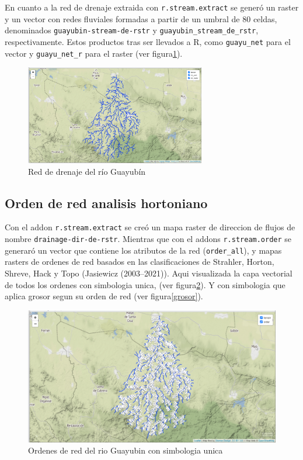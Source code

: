 \documentclass[11pt,]{article}
\begin{document}
En cuanto a la red de drenaje extraida con \texttt{r.stream.extract} se
generó un raster y un vector con redes fluviales formadas a partir de un
umbral de 80 celdas, denominados \texttt{guayubin-stream-de-rstr} y
\texttt{guayubin\_stream\_de\_rstr}, respectivamente. Estos productos
tras ser llevados a R, como \texttt{guayu\_net} para el vector y
\texttt{guayu\_net\_r} para el raster (ver
figura\ref{red de drenaje extraida}).

\begin{figure}
\centering
\includegraphics[width=0.70000\textwidth]{red de drenaje extraida.png}
\caption{Red de drenaje del río Guayubín\label{red de drenaje extraida}}
\end{figure}

\subsection{Orden de red analisis
hortoniano}\label{orden-de-red-analisis-hortoniano}

Con el addon \texttt{r.stream.extract} se creó un mapa raster de
direccion de flujos de nombre \texttt{drainage-dir-de-rstr}. Mientras
que con el addons \texttt{r.stream.order} se generaró un vector que
contiene los atributos de la red (\texttt{order\_all}), y mapas rasters
de ordenes de red basados en las clasificaciones de Strahler, Horton,
Shreve, Hack y Topo (Jasiewicz (2003--2021)). Aqui visualizada la capa
vectorial de todos los ordenes con simbologia unica, (ver
figura\ref{unica}). Y con simbologia que aplica grosor segun su orden de
red (ver figura\ref{grosor}).

\begin{figure}
\centering
\includegraphics[width=1.00000\textwidth]{ordenes de red.png}
\caption{Ordenes de red del rio Guayubin con simbologia
unica\label{unica}}
\end{figure}
\end{document}
